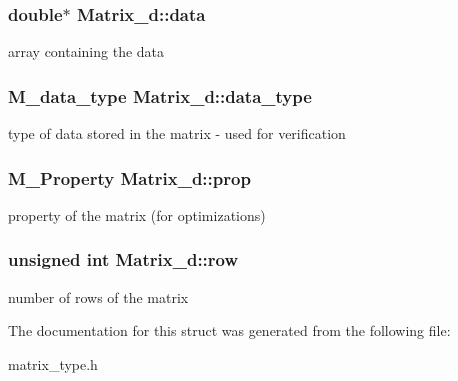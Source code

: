 \subsubsection[{\texorpdfstring{data}{data}}]{\setlength{\rightskip}{0pt plus 5cm}double$\ast$ Matrix\+\_\+d\+::data}\hypertarget{structMatrix__d_a6a9f862ced230c4b29277846ed436c90}{}\label{structMatrix__d_a6a9f862ced230c4b29277846ed436c90}
array containing the data 
\subsubsection[{\texorpdfstring{data\+\_\+type}{data_type}}]{\setlength{\rightskip}{0pt plus 5cm}M\+\_\+data\+\_\+type Matrix\+\_\+d\+::data\+\_\+type}\hypertarget{structMatrix__d_abd54be0a1d23b49811055d9c06690c5d}{}\label{structMatrix__d_abd54be0a1d23b49811055d9c06690c5d}
type of data stored in the matrix -\/ used for verification 
\subsubsection[{\texorpdfstring{prop}{prop}}]{\setlength{\rightskip}{0pt plus 5cm}M\+\_\+\+Property Matrix\+\_\+d\+::prop}\hypertarget{structMatrix__d_af7a8caafdd655171e1c6a9b1f532aa9a}{}\label{structMatrix__d_af7a8caafdd655171e1c6a9b1f532aa9a}
property of the matrix (for optimizations) 
\subsubsection[{\texorpdfstring{row}{row}}]{\setlength{\rightskip}{0pt plus 5cm}unsigned int Matrix\+\_\+d\+::row}\hypertarget{structMatrix__d_ad4e549017d2d1c5dd83e76788de8a89d}{}\label{structMatrix__d_ad4e549017d2d1c5dd83e76788de8a89d}
number of rows of the matrix 

The documentation for this struct was generated from the following file\+:\begin{DoxyCompactItemize}
\item 
matrix\+\_\+type.\+h\end{DoxyCompactItemize}

